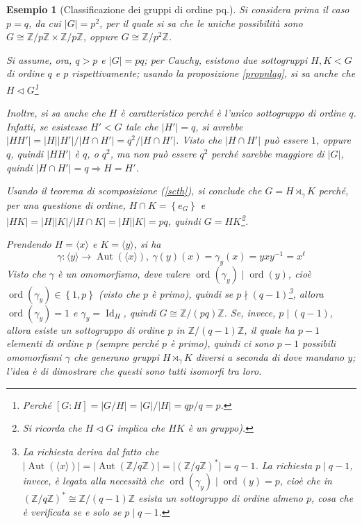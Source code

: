 \documentclass[11pt]{scrartcl}
\theoremstyle{style1}
\newtheorem{esempio}{Esempio}[section]
\numberwithin{equation}{subsection}
\begin{document}
\begin{esempio}
	[Classificazione dei gruppi di ordine pq.]
	Si considera prima il caso $p=q$, da cui $\lvert G \rvert  = p^2$, per il quale si sa che le uniche possibilit\`a sono $G \cong \mathbb{Z}/p\mathbb{Z} \times \mathbb{Z} / p \mathbb{Z}$, oppure $G\cong\mathbb{Z} / p ^2 \mathbb{Z}$.

	Si assume, ora, $q>p$ e $\lvert G \rvert = pq$; per Cauchy, esistono due sottogruppi $H,K < G$ di ordine $q$ e $p$ rispettivamente; usando la proposizione \ref{propnlag}, si sa anche che $H \lhd G$\footnote{Perch\'e $[G:H] = \lvert G / H \rvert = \lvert G  \rvert / \lvert H \rvert = qp / q =p $.}
	
	Inoltre, si sa anche che $H$ \`e caratteristico perch\'e \`e l'unico sottogruppo di ordine $q$. 
	Infatti, se esistesse $H'<G$ tale che $\lvert H' \rvert =q$, si avrebbe $\lvert H H' \rvert = \lvert H \rvert \lvert H' \rvert  / \lvert H \cap H' \rvert = q^2 / \lvert H\cap H' \rvert $. 
	Visto che $\lvert H\cap H' \rvert $ pu\`o essere $1$, oppure $q$, quindi $\lvert H H' \rvert $ \`e $q$, o $q^2$, ma non pu\`o essere $q^2 $ perch\'e sarebbe maggiore di $\lvert G \rvert $, quindi $\lvert H\cap H' \rvert = q \Rightarrow H = H'$.

	Usando il teorema di scomposizione (\ref{scth}), si conclude che $G = H \rtimes _\gamma K$ perch\'e, per una questione di ordine, $H\cap K = \left\{ e_G \right\} $ e $\lvert HK \rvert = \lvert H \rvert \lvert K \rvert / \lvert H\cap K \rvert = \lvert H  \rvert \lvert K \rvert =pq$, quindi $G = HK$\footnote{Si ricorda che $H\lhd G$ implica che $HK$ \`e un gruppo).}.

	Prendendo $H = \langle x \rangle$ e $ K = \langle y \rangle$, si ha
	\[
	\gamma : \langle y \rangle \longrightarrow \operatorname{Aut} (\langle x \rangle),  \ \gamma(y)(x) = \gamma_y(x) = yxy^{-1}= x^\ell 
	\] 
	Visto che $\gamma$ \`e un omomorfismo, deve valere $\operatorname{ord}(\gamma_y)  \mid \operatorname{ord}(y) $, cio\`e $\operatorname{ord}(\gamma_y) \in \left\{ 1,p \right\} $ (visto che $p$ \`e primo), quindi se $p  \nmid  (q - 1)$\footnote{La richiesta deriva dal fatto che $\lvert \operatorname{Aut} (\langle x \rangle) \rvert = \lvert \operatorname{Aut} (\mathbb{Z}/q\mathbb{Z}) \rvert =\lvert (\mathbb{Z}/q\mathbb{Z})^* \rvert = q - 1$. La richiesta $p  \mid q-1$, invece, \`e legata alla necessit\`a che $\operatorname{ord}(\gamma_y)  \mid \operatorname{ord}(y) =p$, cio\`e che in $(\mathbb{Z}/q\mathbb{Z})^*\cong \mathbb{Z}/(q-1)\mathbb{Z}$ esista un sottogruppo di ordine almeno $p$, cosa che \`e verificata se e solo se $p  \mid q-1$.}, allora $\operatorname{ord}(\gamma_y) =1$ e $\gamma_y = \operatorname{Id} _H$, quindi $G \cong \mathbb{Z}/(pq) \mathbb{Z}$.
	Se, invece, $p \mid (q-1)$, allora esiste un sottogruppo di ordine $p$ in $\mathbb{Z}/(q-1)\mathbb{Z}$, il quale ha $p-1$ elementi di ordine $p$ (sempre perch\'e $p$ \`e primo), quindi ci sono $p-1$ possibili omomorfismi $\gamma$ che generano gruppi $H \rtimes _\gamma K$ diversi a seconda di dove mandano $y$; l'idea \`e di dimostrare che questi sono tutti isomorfi tra loro.


\end{esempio}
\end{document}
